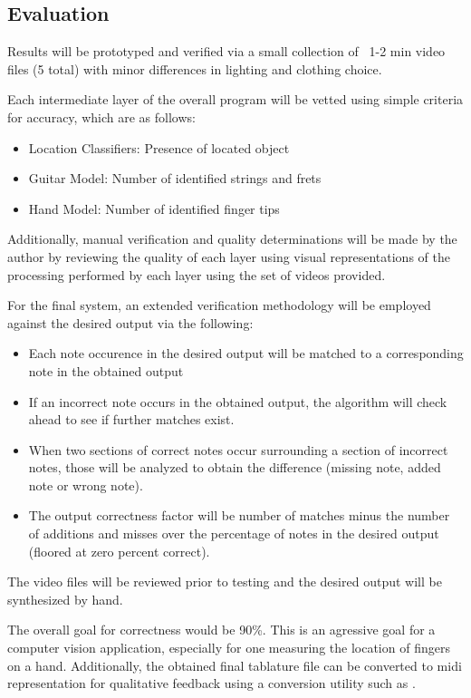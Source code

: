 \subsection{Evaluation}
Results will be prototyped and verified via a small collection of ~1-2 min video files
(5 total) with minor differences in lighting and clothing choice.
\par
Each intermediate layer of the overall program will be vetted using simple criteria
for accuracy, which are as follows:
\begin{itemize}
    \item Location Classifiers: Presence of located object
    \item Guitar Model: Number of identified strings and frets
    \item Hand Model: Number of identified finger tips
\end{itemize}
Additionally, manual verification and quality determinations will be made by the author by reviewing
the quality of each layer using visual representations of the processing performed by each layer using the
set of videos provided.
\par
For the final system, an extended verification methodology will be employed against the desired output via the following:
\begin{itemize}
    \item Each note occurence in the desired output will be matched to a corresponding note in the obtained output
    \item If an incorrect note occurs in the obtained output, the algorithm will check ahead to see if further
        matches exist.
    \item When two sections of correct notes occur surrounding a section of incorrect notes, those will
        be analyzed to obtain the difference (missing note, added note or wrong note).
    \item The output correctness factor will be number of matches minus the number of additions and misses
        over the percentage of notes in the desired output (floored at zero percent correct).
\end{itemize}
The video files will be reviewed prior to testing and the desired output will be synthesized by hand.
\par
The overall goal for correctness would be 90\%.
This is an agressive goal for a computer vision application,
especially for one measuring the location of fingers on a hand.
Additionally, the obtained final tablature file can be converted to midi representation
for qualitative feedback using a conversion utility such as \cite{8notes}.

